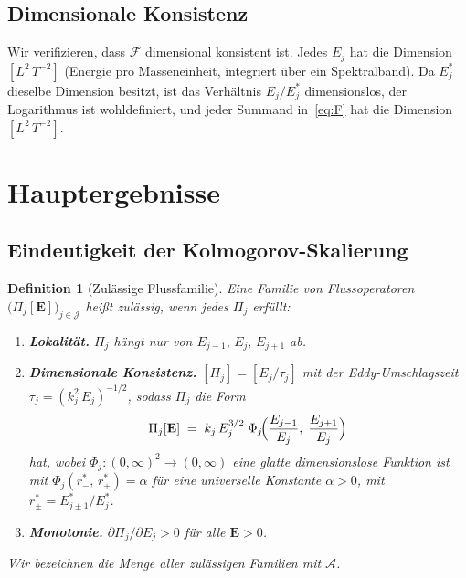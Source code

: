 \documentclass[12pt,a4paper]{article}
\theoremstyle{breakdef}
\newtheorem{definition}{Definition}[section]
\theoremstyle{breakplain}
\theoremstyle{breakdef}
\begin{document}
\subsection{Dimensionale Konsistenz}

Wir verifizieren, dass $\mathcal{F}$ dimensional konsistent ist. Jedes
$E_j$ hat die Dimension $[L^2\,T^{-2}]$ (Energie pro Masseneinheit,
integriert über ein Spektralband). Da $E_j^*$ dieselbe Dimension besitzt,
ist das Verhältnis $E_j/E_j^*$ dimensionslos, der Logarithmus ist
wohldefiniert, und jeder Summand in~\eqref{eq:F} hat die Dimension
$[L^2\,T^{-2}]$.

\section{Hauptergebnisse}\label{sec:results}

\subsection{Eindeutigkeit der Kolmogorov-Skalierung}

\begin{definition}[Zulässige Flussfamilie]\label{def:admissible}
Eine Familie von Flussoperatoren $\bigl(\Pi_j[\mathbf{E}]\bigr)_{j \in
\mathcal{J}}$ heißt \emph{zulässig}, wenn jedes $\Pi_j$ erfüllt:
\begin{enumerate}
  \item[\textup{(A1)}] \textbf{Lokalität.}\quad
    $\Pi_j$ hängt nur von $E_{j-1},\, E_j,\, E_{j+1}$ ab.
  \item[\textup{(A2)}] \textbf{Dimensionale Konsistenz.}\quad
    $[\Pi_j] = [E_j / \tau_j]$ mit der Eddy-Umschlagszeit
    $\tau_j = (k_j^2\,E_j)^{-1/2}$, sodass $\Pi_j$ die Form
    \begin{equation}\label{eq:closure_general}
      \Pi_j[\mathbf{E}]
      \;=\;
      k_j\,E_j^{3/2}\;\Phi_j\!\Bigl(
        \frac{E_{j-1}}{E_j},\;
        \frac{E_{j+1}}{E_j}
      \Bigr)
    \end{equation}
    hat, wobei $\Phi_j : (0,\infty)^2 \to (0,\infty)$ eine glatte
    dimensionslose Funktion ist mit $\Phi_j(r^*_{-},\, r^*_{+}) = \alpha$
    für eine universelle Konstante $\alpha > 0$, mit
    $r^*_{\pm} = E_{j \pm 1}^* / E_j^*$.
  \item[\textup{(A3)}] \textbf{Monotonie.}\quad
    $\partial \Pi_j / \partial E_j > 0$ für alle $\mathbf{E} > 0$.
\end{enumerate}
Wir bezeichnen die Menge aller zulässigen Familien mit $\mathscr{A}$.
\end{definition}
\end{document}
